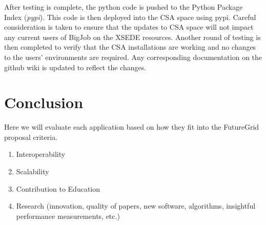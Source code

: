 \documentclass[]{paper}
\begin{document}
After testing is complete, the python code is pushed to the Python
Package Index (\textit{pypi}). This code is then deployed into the CSA
space using pypi. Careful consideration is taken to ensure that the
updates to CSA space will not impact any current users of BigJob on
the XSEDE resources. Another round of testing is then completed to
verify that the CSA installations are working and no changes to the
users' environments are required. Any corresponding documentation on
the github wiki is updated to reflect the changes.


\section{Conclusion}
Here we will evaluate each application based on how they fit into the
FutureGrid proposal criteria.
\begin{enumerate}
\item Interoperability
\item Scalability
\item Contribution to Education
\item Research (innovation, quality of papers, new software, algorithms, insightful performance measurements, etc.)

\end{enumerate}
\begin{thebibliography}{9}
\end{thebibliography}
\end{document}
